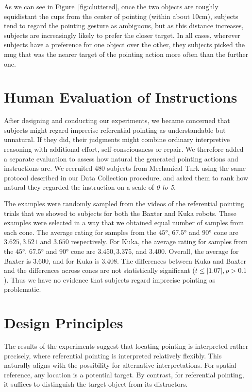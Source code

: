 \documentclass[letterpaper]{article} %
\begin{document}
As we can see in Figure~\ref{fig:cluttered}, once the two objects are roughly equidistant the cups from the center of pointing (within about 10cm), subjects tend to regard the pointing gesture as ambiguous, but as this distance increases, subjects are increasingly likely to prefer the closer target.  In all cases, wherever subjects have a preference for one object over the other, they subjects picked the mug that was the nearer target of the pointing action more often than the further one.




\section{Human Evaluation of Instructions}

After designing and conducting our experiments, we became concerned that subjects might regard imprecise referential pointing as understandable but unnatural.  If they did, their judgments might combine ordinary interpretive reasoning with additional effort, self-consciousness or repair.  We therefore added a separate evaluation to assess how natural the generated pointing actions and instructions are. We recruited 480 subjects from Mechanical Turk using the same protocol described in our Data Collection procedure, and asked them to rank how natural they regarded the instruction on a scale of \textit{0 to 5}. 

The examples were randomly sampled from the videos of the referential pointing trials that we showed to subjects for both the Baxter and Kuka robots. These examples were selected in a way that we obtained equal number of samples from each cone. The average rating for samples from the $\ang{45}$, $\ang{67.5}$ and $\ang{90}$ cone are $3.625, 3.521$
and $3.650$ respectively. For Kuka, the average rating for samples from the $\ang{45}$, $\ang{67.5}$ and $\ang{90}$ cone are $3.450, 3.375$, and $3.400$. Overall, the average for Baxter is $3.600$, and for Kuka is $3.408$. The differences between Kuka and Baxter and the differences across cones are not statistically significant ($t \leq |1.07|, p > 0.1 $).  Thus we have no evidence that subjects regard imprecise pointing as problematic.

\section{Design Principles}

The results of the experiments suggest that locating pointing is interpreted rather precisely, where referential pointing is interpreted relatively flexibly.  This naturally aligns with the possibility for alternative interpretations.  For spatial reference, any location is a potential target.  By contrast, for referential pointing, it suffices to distinguish the target object from its distractors.
\end{document}
